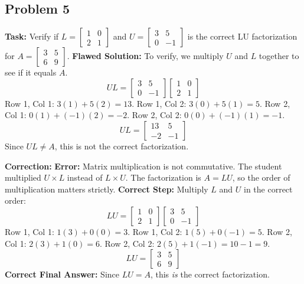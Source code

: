 \documentclass[11pt]{article}
\begin{document}
\subsection{Problem 5}
\textbf{Task:} Verify if $L = \begin{bmatrix} 1 & 0 \\ 2 & 1 \end{bmatrix}$ and $U = \begin{bmatrix} 3 & 5 \\ 0 & -1 \end{bmatrix}$ is the correct LU factorization for $A = \begin{bmatrix} 3 & 5 \\ 6 & 9 \end{bmatrix}$.
\textbf{Flawed Solution:}
To verify, we multiply $U$ and $L$ together to see if it equals $A$.
\[ UL = \begin{bmatrix} 3 & 5 \\ 0 & -1 \end{bmatrix} \begin{bmatrix} 1 & 0 \\ 2 & 1 \end{bmatrix} \]
Row 1, Col 1: $3(1) + 5(2) = 13$.
Row 1, Col 2: $3(0) + 5(1) = 5$.
Row 2, Col 1: $0(1) + (-1)(2) = -2$.
Row 2, Col 2: $0(0) + (-1)(1) = -1$.
\[ UL = \begin{bmatrix} 13 & 5 \\ -2 & -1 \end{bmatrix} \]
Since $UL \neq A$, this is not the correct factorization.

\vspace{1cm}
\textbf{Correction:}
\textbf{Error:} Matrix multiplication is not commutative. The student multiplied $U \times L$ instead of $L \times U$. The factorization is $A = LU$, so the order of multiplication matters strictly.
\textbf{Correct Step:}
Multiply $L$ and $U$ in the correct order:
\[ LU = \begin{bmatrix} 1 & 0 \\ 2 & 1 \end{bmatrix} \begin{bmatrix} 3 & 5 \\ 0 & -1 \end{bmatrix} \]
Row 1, Col 1: $1(3) + 0(0) = 3$.
Row 1, Col 2: $1(5) + 0(-1) = 5$.
Row 2, Col 1: $2(3) + 1(0) = 6$.
Row 2, Col 2: $2(5) + 1(-1) = 10 - 1 = 9$.
\[ LU = \begin{bmatrix} 3 & 5 \\ 6 & 9 \end{bmatrix} \]
\textbf{Correct Final Answer:} Since $LU = A$, this \textit{is} the correct factorization.
\end{document}
